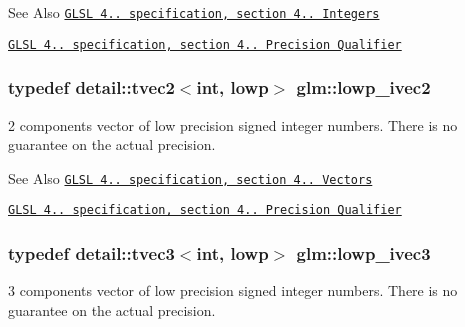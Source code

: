 \begin{DoxySeeAlso}{See Also}
\href{http://www.opengl.org/registry/doc/GLSLangSpec.4.20.8.pdf}{\tt G\-L\-S\-L 4.. specification, section 4.. Integers} 

\href{http://www.opengl.org/registry/doc/GLSLangSpec.4.20.8.pdf}{\tt G\-L\-S\-L 4.. specification, section 4.. Precision Qualifier} 
\end{DoxySeeAlso}
\hypertarget{group__core__precision_ga562c5c67d6431ab88fc4a032239e2137}{
\subsubsection[{lowp\-\_\-ivec2}]{\setlength{\rightskip}{0pt plus 5cm}typedef detail\-::tvec2$<$int, lowp$>$ {\bf glm\-::lowp\-\_\-ivec2}}}\label{group__core__precision_ga562c5c67d6431ab88fc4a032239e2137}
2 components vector of low precision signed integer numbers. There is no guarantee on the actual precision.

\begin{DoxySeeAlso}{See Also}
\href{http://www.opengl.org/registry/doc/GLSLangSpec.4.20.8.pdf}{\tt G\-L\-S\-L 4.. specification, section 4.. Vectors} 

\href{http://www.opengl.org/registry/doc/GLSLangSpec.4.20.8.pdf}{\tt G\-L\-S\-L 4.. specification, section 4.. Precision Qualifier} 
\end{DoxySeeAlso}
\hypertarget{group__core__precision_gad133fec5c629e3f712c1270e15144e6c}{
\subsubsection[{lowp\-\_\-ivec3}]{\setlength{\rightskip}{0pt plus 5cm}typedef detail\-::tvec3$<$int, lowp$>$ {\bf glm\-::lowp\-\_\-ivec3}}}\label{group__core__precision_gad133fec5c629e3f712c1270e15144e6c}
3 components vector of low precision signed integer numbers. There is no guarantee on the actual precision.

